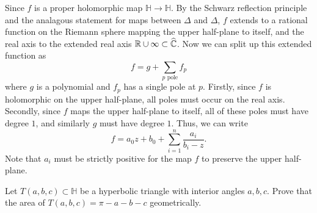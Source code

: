 \documentclass{pset}
\begin{document}
\begin{solution}
  Since $f$ is a proper holomorphic map $\mathbb{H} \to \mathbb{H}$. By the Schwarz reflection principle and the analagous statement for maps between $\Delta$ and $\Delta$, $f$ extends to a rational function on the Riemann sphere mapping the upper half-plane to itself, and the real axis to the extended real axis $\mathbb{R}\cup \infty\subset \widehat{\mathbb{C}}$. Now we can split up this extended function as
  \[f = g +\sum_{p\textrm{ pole}} f_p\]
  where $g$ is a polynomial and $f_p$ has a single pole at $p$. Firstly, since $f$ is holomorphic on the upper half-plane, all poles must occur on the real axis. Secondly, since $f$ maps the upper half-plane to itself, all of these poles must have degree $1$, and similarly $g$ must have degree $1$. Thus, we can write
  \[ f = a_0z+b_0 + \sum^n_{i=1}\frac{a_i}{b_i - z}.\]
  Note that $a_i$ must be strictly positive for the map $f$ to preserve the upper half-plane.
\end{solution}

\begin{problem}{2.17}
  Let $T(a,b,c)\subset \mathbb{H}$ be a hyperbolic triangle with interior angles $a,b,c$. Prove that the area of $T(a,b,c)=\pi - a - b -c$ geometrically.
\end{problem}
\end{document}
